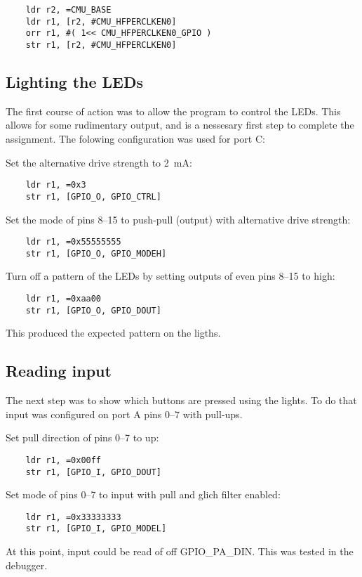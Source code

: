 \begin{verbatim}
    ldr r2, =CMU_BASE
    ldr r1, [r2, #CMU_HFPERCLKEN0]
    orr r1, #( 1<< CMU_HFPERCLKEN0_GPIO )
    str r1, [r2, #CMU_HFPERCLKEN0]
\end{verbatim}


\subsection{Lighting the LEDs}
The first course of action was to allow the program to control the LEDs.
This allows for some rudimentary output, and is a nessesary first step to complete the assignment.
The folowing configuration was used for port C:

Set the alternative drive strength to \SI{2}{\milli\ampere}:
\begin{verbatim}
    ldr r1, =0x3
    str r1, [GPIO_O, GPIO_CTRL]
\end{verbatim}

Set the mode of pins 8--15 to push-pull (output) with alternative drive strength:
\begin{verbatim}
    ldr r1, =0x55555555
    str r1, [GPIO_O, GPIO_MODEH]
\end{verbatim}

Turn off a pattern of the LEDs by setting outputs of even pins 8--15 to high:
\begin{verbatim}
    ldr r1, =0xaa00
    str r1, [GPIO_O, GPIO_DOUT]
\end{verbatim}

This produced the expected pattern on the ligths.


\subsection{Reading input}
The next step was to show which buttons are pressed using the lights.
To do that input was configured on port A pins 0--7 with pull-ups.

Set pull direction of pins 0--7 to up:
\begin{verbatim}
    ldr r1, =0x00ff
    str r1, [GPIO_I, GPIO_DOUT]
\end{verbatim}

Set mode of pins 0--7 to input with pull and glich filter enabled:
\begin{verbatim}
    ldr r1, =0x33333333
    str r1, [GPIO_I, GPIO_MODEL]
\end{verbatim}

At this point, input could be read of off GPIO\_PA\_DIN.
This was tested in the debugger.

